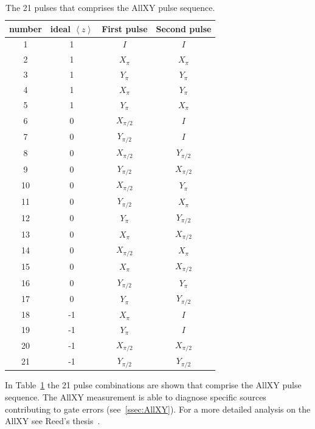       \begin{table}[h]
        \centering
        \begin{tabular}{c c c c }
          \toprule
          number & ideal $\left<z\right>$ & First pulse & Second pulse \\
          \midrule
          1  & 1  & $I$         & $I$         \\
          2  & 1  & $X_\pi$     & $X_\pi$     \\
          3  & 1  & $Y_\pi$     & $Y_\pi$     \\
          4  & 1  & $X_\pi$     & $Y_\pi$     \\
          5  & 1  & $Y_\pi$     & $X_\pi$     \\
          6  & 0  & $X_{\pi/2}$ & $I$         \\
          7  & 0  & $Y_{\pi/2}$ & $I$         \\
          8  & 0  & $X_{\pi/2}$ & $Y_{\pi/2}$ \\
          9  & 0  & $Y_{\pi/2}$ & $X_{\pi/2}$ \\
          10 & 0  & $X_{\pi/2}$ & $Y_\pi$     \\
          11 & 0  & $Y_{\pi/2}$ & $X_\pi$     \\
          12 & 0  & $Y_\pi$     & $Y_{\pi/2}$ \\
          13 & 0  & $X_\pi$     & $X_{\pi/2}$ \\
          14 & 0  & $X_{\pi/2}$ & $X_\pi$     \\
          15 & 0  & $X_\pi$     & $X_{\pi/2}$ \\
          16 & 0  & $Y_{\pi/2}$ & $Y_\pi$     \\
          17 & 0  & $Y_\pi$     & $Y_{\pi/2}$ \\
          18 & -1 & $X_\pi$     & $I$         \\
          19 & -1 & $Y_\pi$     & $I$         \\
          20 & -1 & $X_{\pi/2}$ & $X_{\pi/2}$ \\
          21 & -1 & $Y_{\pi/2}$ & $Y_{\pi/2}$ \\
          \bottomrule
        \end{tabular}
        \label{tab:AllXY sequence}
        \caption{The 21 pulses that comprises the AllXY pulse sequence.}
      \end{table}

      In Table~\ref{tab:AllXY sequence} the 21 pulse combinations are shown that comprise the AllXY pulse sequence. The AllXY measurement is able to diagnose specific sources contributing to gate errors (see~\ref{ssec:AllXY}). For a more detailed analysis on the AllXY see Reed's thesis~\cite{Reed}.

